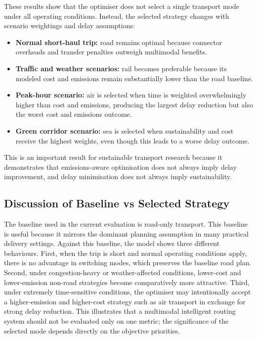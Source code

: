 These results show that the optimiser does not select a single transport mode under all operating conditions. Instead, the selected strategy changes with scenario weightings and delay assumptions:
\begin{itemize}
    \item \textbf{Normal short-haul trip:} road remains optimal because connector overheads and transfer penalties outweigh multimodal benefits.
    \item \textbf{Traffic and weather scenarios:} rail becomes preferable because its modeled cost and emissions remain substantially lower than the road baseline.
    \item \textbf{Peak-hour scenario:} air is selected when time is weighted overwhelmingly higher than cost and emissions, producing the largest delay reduction but also the worst cost and emissions outcome.
    \item \textbf{Green corridor scenario:} sea is selected when sustainability and cost receive the highest weights, even though this leads to a worse delay outcome.
\end{itemize}

This is an important result for sustainable transport research because it demonstrates that emissions-aware optimisation does not always imply delay improvement, and delay minimisation does not always imply sustainability.

\subsection{Discussion of Baseline vs Selected Strategy}
The baseline used in the current evaluation is road-only transport. This baseline is useful because it mirrors the dominant planning assumption in many practical delivery settings. Against this baseline, the model shows three different behaviours. First, when the trip is short and normal operating conditions apply, there is no advantage in switching modes, which preserves the baseline road plan. Second, under congestion-heavy or weather-affected conditions, lower-cost and lower-emission non-road strategies become comparatively more attractive. Third, under extremely time-sensitive conditions, the optimiser may intentionally accept a higher-emission and higher-cost strategy such as air transport in exchange for strong delay reduction. This illustrates that a multimodal intelligent routing system should not be evaluated only on one metric; the significance of the selected mode depends directly on the objective priorities.

